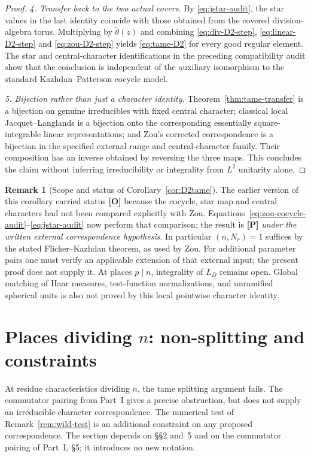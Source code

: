 \documentclass[11pt]{article}
\theoremstyle{plain}
\theoremstyle{definition}
\newtheorem{remark}[theorem]{Remark}
\begin{document}
\begin{proof}
\emph{4. Transfer back to the two actual covers.}
By \eqref{eq:jstar-audit}, the star values in the last
identity coincide with those obtained from the covered
division-algebra torus.  Multiplying by
$\widetilde\theta(z)$ and combining
\eqref{eq:div-D2-step}, \eqref{eq:linear-D2-step}
and \eqref{eq:zou-D2-step} yields
\eqref{eq:tame-D2} for every good regular element.
The star and central-character identifications in the
preceding compatibility audit show that the conclusion is
independent of the auxiliary isomorphism to the standard
Kazhdan--Patterson cocycle model.

\emph{5. Bijection rather than just a character identity.}
Theorem~\ref{thm:tame-transfer} is a bijection on genuine
irreducibles with fixed central character; classical local
Jacquet--Langlands is a bijection onto the corresponding
essentially square-integrable linear representations; and
Zou's corrected correspondence is a bijection in the
specified external range and central-character family.
Their composition has an inverse obtained by reversing the
three maps.  This concludes the claim without inferring
irreducibility or integrality from $L^2$ unitarity alone.
\end{proof}
\begin{remark}[Scope and status of Corollary~\ref{cor:D2tame}]
The earlier version of this corollary carried status
\textbf{[O]} because the cocycle, star map and central
characters had not been compared explicitly with Zou.
Equations~\eqref{eq:zou-cocycle-audit}--\eqref{eq:jstar-audit}
now perform that comparison; the result is \textbf{[P]}
\emph{under the written external correspondence hypothesis}.
In particular $(n,N_r)=1$ suffices by the stated
Flicker--Kazhdan theorem, as used by Zou.  For additional
parameter pairs one must verify an applicable extension of
that external input; the present proof does not supply it.
At places $p\mid n$, integrality of $L_D$ remains open.
Global matching of Haar measures, test-function normalizations,
and unramified spherical units is also not proved by this
local pointwise character identity.
\end{remark}

\section{Places dividing \texorpdfstring{$n$}{n}: non-splitting and constraints}\label{sec:wild}
At residue characteristics dividing $n$, the tame splitting
argument fails. The commutator pairing from Part~I gives a precise
obstruction, but does not supply an irreducible-character
correspondence. The numerical test of Remark~\ref{rem:wild-test}
is an additional constraint on any proposed correspondence. The section depends on \S\S2 and~5 and on the commutator pairing of Part~I, \S5; it introduces no new notation.
\end{document}
